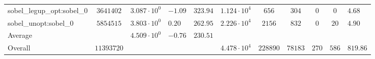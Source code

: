 \begin{tabular}{|l|c|HHc|c|c|c|c|cH|}
sobel\_legup\_opt:sobel\_0                      & $ 3641402  $ & $ 3.087 \cdot 10^{0} $ & $ -1.09 $ & $ 323.94 $ & $ 1.124 \cdot 10^{4}  $ & $ 656    $ & $ 304   $ & $ 0   $ & $ 0   $ & $ 4.68    $ \\
sobel\_unopt:sobel\_0                           & $ 5854515  $ & $ 3.803 \cdot 10^{0} $ & $ 0.20  $ & $ 262.95 $ & $ 2.226 \cdot 10^{4}  $ & $ 2156   $ & $ 832   $ & $ 0   $ & $ 20  $ & $ 4.90    $ \\
\hline
Average                                         & $          $ & $ 4.509 \cdot 10^{0} $ & $ -0.76 $ & $ 230.51 $ & $                     $ & $        $ & $       $ & $     $ & $     $ & $         $ \\
\hline
Overall                                         & $ 11393720 $ & $                    $ & $       $ & $        $ & $ 4.478 \cdot 10^{4}  $ & $ 228890 $ & $ 78183 $ & $ 270 $ & $ 586 $ & $ 819.86  $ \\
\hline
\end{tabular}
